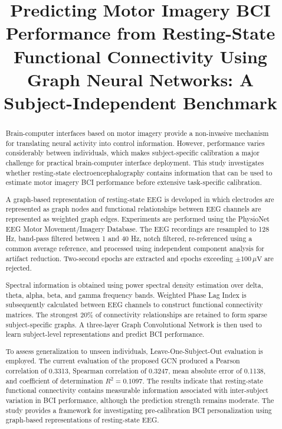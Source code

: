 \documentclass[conference]{IEEEtran}
\begin{document}
\title{Predicting Motor Imagery BCI Performance from Resting-State Functional Connectivity Using Graph Neural Networks: A Subject-Independent Benchmark}

\author{
}

\maketitle

\begin{abstract}
Brain-computer interfaces based on motor imagery provide a non-invasive mechanism for translating neural activity into control information. However, performance varies considerably between individuals, which makes subject-specific calibration a major challenge for practical brain-computer interface deployment. This study investigates whether resting-state electroencephalography contains information that can be used to estimate motor imagery BCI performance before extensive task-specific calibration.

A graph-based representation of resting-state EEG is developed in which electrodes are represented as graph nodes and functional relationships between EEG channels are represented as weighted graph edges. Experiments are performed using the PhysioNet EEG Motor Movement/Imagery Database. The EEG recordings are resampled to 128 Hz, band-pass filtered between 1 and 40 Hz, notch filtered, re-referenced using a common average reference, and processed using independent component analysis for artifact reduction. Two-second epochs are extracted and epochs exceeding $\pm 100\,\mu\text{V}$ are rejected.

Spectral information is obtained using power spectral density estimation over delta, theta, alpha, beta, and gamma frequency bands. Weighted Phase Lag Index is subsequently calculated between EEG channels to construct functional connectivity matrices. The strongest 20\% of connectivity relationships are retained to form sparse subject-specific graphs. A three-layer Graph Convolutional Network is then used to learn subject-level representations and predict BCI performance.

To assess generalization to unseen individuals, Leave-One-Subject-Out evaluation is employed. The current evaluation of the proposed GCN produced a Pearson correlation of 0.3313, Spearman correlation of 0.3247, mean absolute error of 0.1138, and coefficient of determination $R^2 = 0.1097$. The results indicate that resting-state functional connectivity contains measurable information associated with inter-subject variation in BCI performance, although the prediction strength remains moderate. The study provides a framework for investigating pre-calibration BCI personalization using graph-based representations of resting-state EEG.
\end{abstract}
\end{document}
